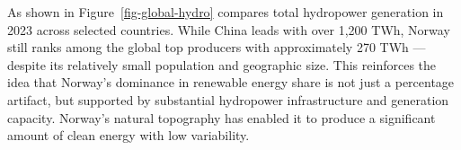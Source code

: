 \documentclass[
  letterpaper,
  DIV=11,
  numbers=noendperiod]{scrartcl}
\begin{document}
As shown in Figure~\ref{fig-global-hydro} compares total hydropower
generation in 2023 across selected countries. While China leads with
over 1,200 TWh, Norway still ranks among the global top producers with
approximately 270 TWh --- despite its relatively small population and
geographic size. This reinforces the idea that Norway's dominance in
renewable energy share is not just a percentage artifact, but supported
by substantial hydropower infrastructure and generation capacity.
Norway's natural topography has enabled it to produce a significant
amount of clean energy with low variability.
\end{document}
